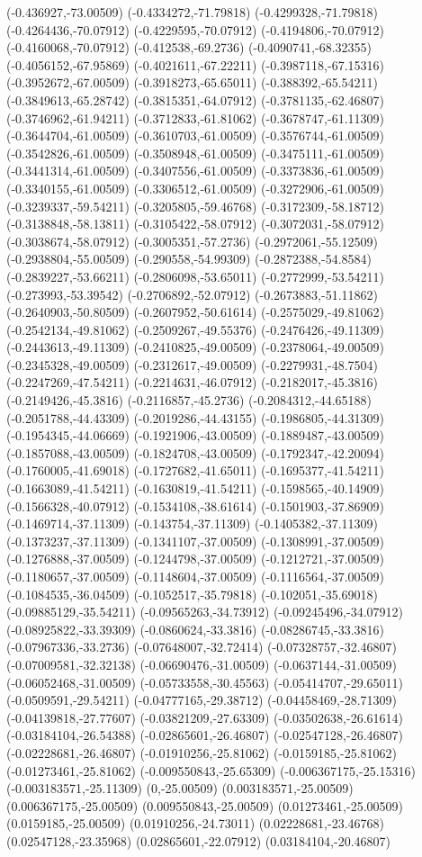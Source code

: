 \documentclass[12pt,letterpaper]{article}
\begin{document}
(-0.436927,-73.00509) (-0.4334272,-71.79818) (-0.4299328,-71.79818) (-0.4264436,-70.07912) (-0.4229595,-70.07912) (-0.4194806,-70.07912) (-0.4160068,-70.07912) (-0.412538,-69.2736) (-0.4090741,-68.32355) (-0.4056152,-67.95869) (-0.4021611,-67.22211) (-0.3987118,-67.15316) (-0.3952672,-67.00509) (-0.3918273,-65.65011) (-0.388392,-65.54211) (-0.3849613,-65.28742) (-0.3815351,-64.07912) (-0.3781135,-62.46807) (-0.3746962,-61.94211) (-0.3712833,-61.81062) (-0.3678747,-61.11309) (-0.3644704,-61.00509) (-0.3610703,-61.00509) (-0.3576744,-61.00509) (-0.3542826,-61.00509) (-0.3508948,-61.00509) (-0.3475111,-61.00509) (-0.3441314,-61.00509) (-0.3407556,-61.00509) (-0.3373836,-61.00509) (-0.3340155,-61.00509) (-0.3306512,-61.00509) (-0.3272906,-61.00509) (-0.3239337,-59.54211) (-0.3205805,-59.46768) (-0.3172309,-58.18712) (-0.3138848,-58.13811) (-0.3105422,-58.07912) (-0.3072031,-58.07912) (-0.3038674,-58.07912) (-0.3005351,-57.2736) (-0.2972061,-55.12509) (-0.2938804,-55.00509) (-0.290558,-54.99309) (-0.2872388,-54.8584) (-0.2839227,-53.66211) (-0.2806098,-53.65011) (-0.2772999,-53.54211) (-0.273993,-53.39542) (-0.2706892,-52.07912) (-0.2673883,-51.11862) (-0.2640903,-50.80509) (-0.2607952,-50.61614) (-0.2575029,-49.81062) (-0.2542134,-49.81062) (-0.2509267,-49.55376) (-0.2476426,-49.11309) (-0.2443613,-49.11309) (-0.2410825,-49.00509) (-0.2378064,-49.00509) (-0.2345328,-49.00509) (-0.2312617,-49.00509) (-0.2279931,-48.7504) (-0.2247269,-47.54211) (-0.2214631,-46.07912) (-0.2182017,-45.3816) (-0.2149426,-45.3816) (-0.2116857,-45.2736) (-0.2084312,-44.65188) (-0.2051788,-44.43309) (-0.2019286,-44.43155) (-0.1986805,-44.31309) (-0.1954345,-44.06669) (-0.1921906,-43.00509) (-0.1889487,-43.00509) (-0.1857088,-43.00509) (-0.1824708,-43.00509) (-0.1792347,-42.20094) (-0.1760005,-41.69018) (-0.1727682,-41.65011) (-0.1695377,-41.54211) (-0.1663089,-41.54211) (-0.1630819,-41.54211) (-0.1598565,-40.14909) (-0.1566328,-40.07912) (-0.1534108,-38.61614) (-0.1501903,-37.86909) (-0.1469714,-37.11309) (-0.143754,-37.11309) (-0.1405382,-37.11309) (-0.1373237,-37.11309) (-0.1341107,-37.00509) (-0.1308991,-37.00509) (-0.1276888,-37.00509) (-0.1244798,-37.00509) (-0.1212721,-37.00509) (-0.1180657,-37.00509) (-0.1148604,-37.00509) (-0.1116564,-37.00509) (-0.1084535,-36.04509) (-0.1052517,-35.79818) (-0.102051,-35.69018) (-0.09885129,-35.54211) (-0.09565263,-34.73912) (-0.09245496,-34.07912) (-0.08925822,-33.39309) (-0.0860624,-33.3816) (-0.08286745,-33.3816) (-0.07967336,-33.2736) (-0.07648007,-32.72414) (-0.07328757,-32.46807) (-0.07009581,-32.32138) (-0.06690476,-31.00509) (-0.0637144,-31.00509) (-0.06052468,-31.00509) (-0.05733558,-30.45563) (-0.05414707,-29.65011) (-0.0509591,-29.54211) (-0.04777165,-29.38712) (-0.04458469,-28.71309) (-0.04139818,-27.77607) (-0.03821209,-27.63309) (-0.03502638,-26.61614) (-0.03184104,-26.54388) (-0.02865601,-26.46807) (-0.02547128,-26.46807) (-0.02228681,-26.46807) (-0.01910256,-25.81062) (-0.0159185,-25.81062) (-0.01273461,-25.81062) (-0.009550843,-25.65309) (-0.006367175,-25.15316) (-0.003183571,-25.11309) (0,-25.00509) (0.003183571,-25.00509) (0.006367175,-25.00509) (0.009550843,-25.00509) (0.01273461,-25.00509) (0.0159185,-25.00509) (0.01910256,-24.73011) (0.02228681,-23.46768) (0.02547128,-23.35968) (0.02865601,-22.07912) (0.03184104,-20.46807) 
\end{document}
